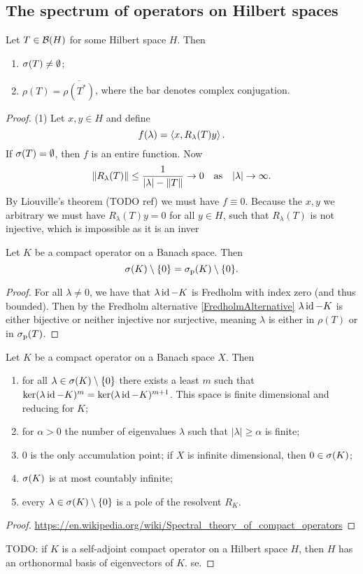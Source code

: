\subsection{The spectrum of operators on Hilbert spaces}
\begin{proposition}
Let $T \in \operatorname{\mathcal{B}}(H)$ for some Hilbert space $H$. Then
\begin{enumerate}
\item $\sigma(T) \neq \emptyset$;
\item $\rho(T) = \overline{\rho(T^*)}$, where the bar denotes complex conjugation.
\end{enumerate}
\end{proposition}
\begin{proof}
(1) Let $x,y\in H$ and define
\[ f(\lambda) = \left\langle x,R_\lambda(T)y \right\rangle. \]
If $\sigma(T) = \emptyset$, then $f$ is an entire function. Now
\[ \lVert R_\lambda(T)\rVert \leq \frac{1}{|\lambda| - \lVert T\rVert} \to 0 \quad\text{as}\quad |\lambda| \to \infty. \]
By Liouville's theorem (TODO ref) we must have $f\equiv 0$. Because the $x,y$ we arbitrary we must have $R_\lambda(T)y = 0$ for all $y\in H$, such that $R_\lambda(T)$ is not injective, which is impossible as it is an inver\begin{proposition}
Let $K$ be a compact operator on a Banach space. Then
\[ \sigma(K)\setminus\{0\} = \sigma_\text{p}(K)\setminus\{0\}. \]
\end{proposition}
\begin{proof}
For all $\lambda\neq 0$, we have that $\lambda\operatorname{id} - K$ is Fredholm with index zero (and thus bounded). Then by the Fredholm alternative \ref{FredholmAlternative} $\lambda\operatorname{id} - K$ is either bijective or neither injective nor surjective, meaning $\lambda$ is either in $\rho(T)$ or in $\sigma_\text{p}(T)$. 
\end{proof}

\begin{proposition} \label{spectrumCompactOperator}
Let $K$ be a compact operator on a Banach space $X$. Then
\begin{enumerate}
\item for all $\lambda\in\sigma(K)\setminus\{0\}$ there exists a least $m$ such that $\ker(\lambda\operatorname{id}- K)^m = \ker(\lambda\operatorname{id}- K)^{m+1}$. This space is finite dimensional and reducing for $K$;
\item for $\alpha > 0$ the number of eigenvalues $\lambda$ such that $|\lambda|\geq \alpha$ is finite;
\item $0$ is the only accumulation point; if $X$ is infinite dimensional, then $0\in\sigma(K)$;
\item $\sigma(K)$ is at most countably infinite;
\item every $\lambda \in \sigma(K)\setminus \{0\}$ is a pole of the resolvent $R_K$.
\end{enumerate}
\end{proposition}
\begin{proof}
\url{https://en.wikipedia.org/wiki/Spectral_theory_of_compact_operators}
\end{proof}
TODO: if $K$ is a self-adjoint compact operator on a Hilbert space $H$, then $H$ has an orthonormal basis of eigenvectors of $K$.
se.


\end{proof}

